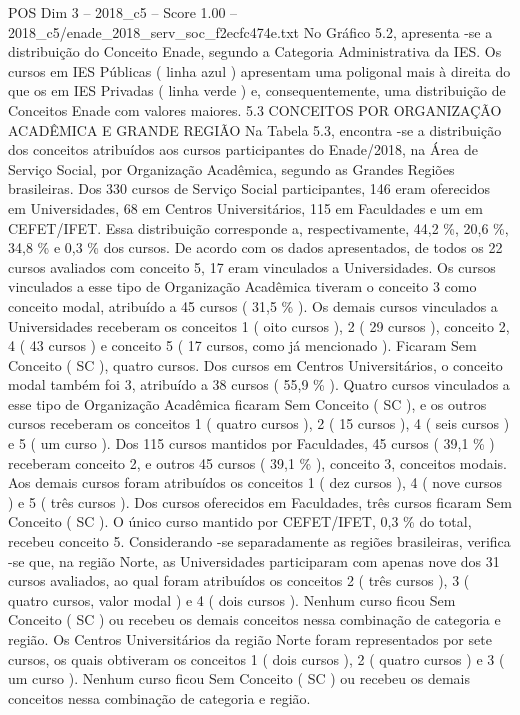 \begin{textsample}{POS Dim 3 – 2018\_c5 – Score 1.00 – 2018\_c5/enade\_2018\_serv\_soc\_f2ecfc474e.txt}
No Gráfico 5.2, apresenta -se a distribuição do Conceito Enade, segundo a Categoria Administrativa da IES.
Os cursos em IES Públicas ( linha azul ) apresentam uma poligonal mais à direita do que os em IES Privadas ( linha verde ) e, consequentemente, uma distribuição de Conceitos Enade com valores maiores. 5.3 CONCEITOS POR ORGANIZAÇÃO ACADÊMICA E GRANDE REGIÃO Na Tabela 5.3, encontra -se a distribuição dos conceitos atribuídos aos cursos participantes do Enade/2018, na Área de Serviço Social, por Organização Acadêmica, segundo as Grandes Regiões brasileiras.
Dos 330 cursos de Serviço Social participantes, 146 eram oferecidos em Universidades, 68 em Centros Universitários, 115 em Faculdades e um em CEFET/IFET.
Essa distribuição corresponde a, respectivamente, 44,2 \%, 20,6 \%, 34,8 \% e 0,3 \% dos cursos.
De acordo com os dados apresentados, de todos os 22 cursos avaliados com conceito 5, 17 eram vinculados a Universidades.
Os cursos vinculados a esse tipo de Organização Acadêmica tiveram o conceito 3 como conceito modal, atribuído a 45 cursos ( 31,5 \% ).
Os demais cursos vinculados a Universidades receberam os conceitos 1 ( oito cursos ), 2 ( 29 cursos ), conceito 2, 4 ( 43 cursos ) e conceito 5 ( 17 cursos, como já mencionado ).
Ficaram Sem Conceito ( SC ), quatro cursos.
Dos cursos em Centros Universitários, o conceito modal também foi 3, atribuído a 38 cursos ( 55,9 \% ).
Quatro cursos vinculados a esse tipo de Organização Acadêmica ficaram Sem Conceito ( SC ), e os outros cursos receberam os conceitos 1 ( quatro cursos ), 2 ( 15 cursos ), 4 ( seis cursos ) e 5 ( um curso ).
Dos 115 cursos mantidos por Faculdades, 45 cursos ( 39,1 \% ) receberam conceito 2, e outros 45 cursos ( 39,1 \% ), conceito 3, conceitos modais.
Aos demais cursos foram atribuídos os conceitos 1 ( dez cursos ), 4 ( nove cursos ) e 5 ( três cursos ).
Dos cursos oferecidos em Faculdades, três cursos ficaram Sem Conceito ( SC ).
O único curso mantido por CEFET/IFET, 0,3 \% do total, recebeu conceito 5.
Considerando -se separadamente as regiões brasileiras, verifica -se que, na região Norte, as Universidades participaram com apenas nove dos 31 cursos avaliados, ao qual foram atribuídos os conceitos 2 ( três cursos ), 3 ( quatro cursos, valor modal ) e 4 ( dois cursos ).
Nenhum curso ficou Sem Conceito ( SC ) ou recebeu os demais conceitos nessa combinação de categoria e região.
Os Centros Universitários da região Norte foram representados por sete cursos, os quais obtiveram os conceitos 1 ( dois cursos ), 2 ( quatro cursos ) e 3 ( um curso ).
Nenhum curso ficou Sem Conceito ( SC ) ou recebeu os demais conceitos nessa combinação de categoria e região.

\end{textsample}
